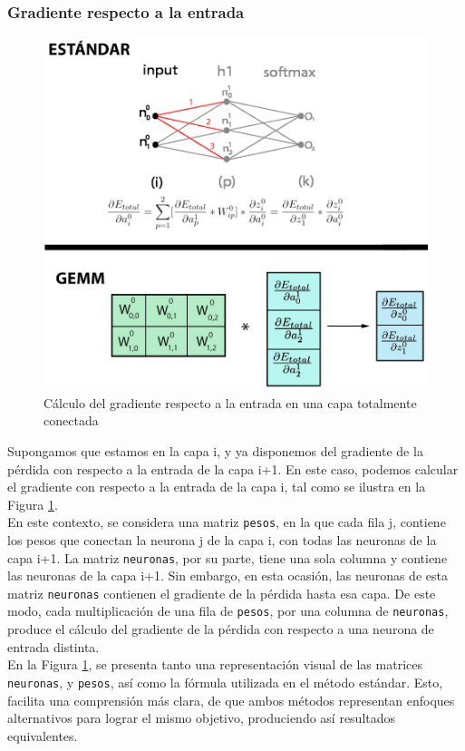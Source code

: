 \subsubsection{Gradiente respecto a la entrada}
\begin{figure}[H]
	\centering
	\includegraphics[scale=0.35]{imagenes/gemm_fully_back_input.jpg}  
	\caption{Cálculo del gradiente respecto a la entrada en una capa totalmente conectada}
	\label{fig:gemm_fully_back_input}
\end{figure}

Supongamos que estamos en la capa i, y ya disponemos del gradiente de la pérdida con respecto a la entrada de la capa i+1. En este caso, podemos calcular el gradiente con respecto a la entrada de la capa i, tal como se ilustra en la Figura \ref{fig:gemm_fully_back_input}. \\
En este contexto, se considera una matriz \texttt{pesos}, en la que cada fila j, contiene los pesos que conectan la neurona j de la capa i, con todas las neuronas de la capa i+1. La matriz \texttt{neuronas}, por su parte, tiene una sola columna y contiene las neuronas de la capa i+1. Sin embargo, en esta ocasión, las neuronas de esta matriz \texttt{neuronas} contienen el gradiente de la pérdida hasta esa capa. De este modo, cada multiplicación de una fila de \texttt{pesos}, por una columna de \texttt{neuronas}, produce el cálculo del gradiente de la pérdida con respecto a una neurona de entrada distinta. \\
En la Figura \ref{fig:gemm_fully_back_input}, se presenta tanto una representación visual de las matrices \texttt{neuronas}, y \texttt{pesos}, así como la fórmula utilizada en el método estándar. Esto, facilita una comprensión más clara, de que ambos métodos representan enfoques alternativos para lograr el mismo objetivo, produciendo así resultados equivalentes.

